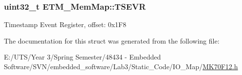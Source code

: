 \subsubsection[{T\+S\+E\+V\+R}]{\setlength{\rightskip}{0pt plus 5cm}uint32\+\_\+t E\+T\+M\+\_\+\+Mem\+Map\+::\+T\+S\+E\+V\+R}\label{struct_e_t_m___mem_map_ad30bdaff018bc7d3b586ce0ca41dfd9b}
Timestamp Event Register, offset\+: 0x1\+F8 

The documentation for this struct was generated from the following file\+:\begin{DoxyCompactItemize}
\item 
E\+:/\+U\+T\+S/\+Year 3/\+Spring Semester/48434 -\/ Embedded Software/\+S\+V\+N/embedded\+\_\+software/\+Lab3/\+Static\+\_\+\+Code/\+I\+O\+\_\+\+Map/\hyperlink{_m_k70_f12_8h}{M\+K70\+F12.\+h}\end{DoxyCompactItemize}
